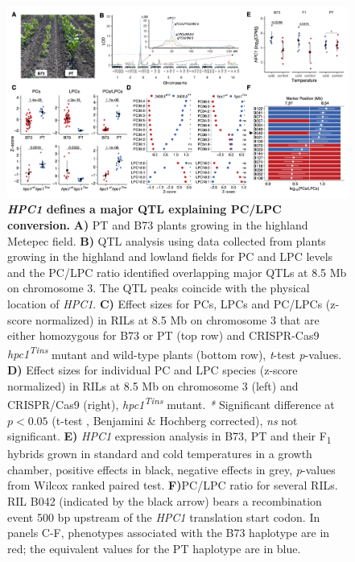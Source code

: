 \documentclass[9pt,twocolumn,twoside,lineno]{biorxiv}
\begin{document}
\begin{figure}[!ht]
\begin{center}
\includegraphics[width=0.8\paperwidth]{Figures/Fig_3.png}
\caption{\textbf{\textit{HPC1} defines a major QTL explaining PC/LPC conversion.} 
\textbf{A)} PT and B73 plants growing in the highland Metepec field. 
\textbf{B)} QTL analysis using data collected from plants growing in the highland and lowland fields for PC and LPC levels and the PC/LPC ratio identified overlapping major QTLs at 8.5 Mb on chromosome 3. 
The QTL peaks coincide with the physical location of \textit{HPC1}. 
\textbf{C)} Effect sizes for PCs, LPCs and PC/LPCs (z-score normalized) in RILs at 8.5 Mb on chromosome 3 that are either homozygous for B73 or PT (top row) and CRISPR-Cas9 \textit{hpc1\textsuperscript{Tins}} mutant and wild-type plants (bottom row), \textit{t}-test \textit{p}-values.        
\textbf{D)} Effect sizes for individual PC and LPC species (z-score normalized) in RILs at 8.5 Mb on chromosome 3 (left) and CRISPR/Cas9 (right),
\textit{hpc1\textsuperscript{Tins}} mutant. \textit{*} Significant difference at $p < 0.05$ (t-test , Benjamini \& Hochberg corrected), \textit{ns} not significant.
\textbf{E)} \textit{HPC1} expression analysis in B73, PT and their F\textsubscript{1} hybrids grown in standard and cold temperatures in a growth chamber, positive effects in black, negative effects in grey, \textit{p}-values from Wilcox ranked paired test.
\textbf{F)}PC/LPC ratio for several RILs. RIL B042 (indicated by the black arrow) bears a recombination event 500 bp upstream of the \textit{HPC1} translation start codon.
In panels C-F, phenotypes associated with the B73 haplotype are in red; the equivalent values for the PT haplotype are in blue.}
\label{Fig3}
\end{center}
\end{figure} 
\end{document}

